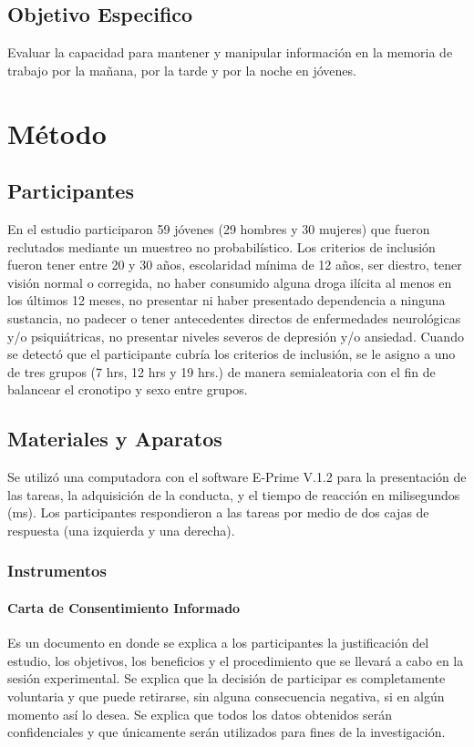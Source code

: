 \documentclass[12pt,letterpaper,final]{article}
\let\cite\cite %
\begin{document}
\subsection{Objetivo Especifico}
Evaluar la capacidad para mantener y manipular información en la memoria de trabajo  por la mañana, por la tarde y por la noche en jóvenes. %

\newpage

\section{Método}
\subsection{Participantes}
En el estudio participaron 59 jóvenes (29 hombres y 30 mujeres) que fueron reclutados mediante un muestreo no probabilístico. Los criterios de inclusión fueron tener entre 20 y 30 años, escolaridad mínima de 12 años, ser diestro, tener visión normal o corregida, no haber consumido alguna droga ilícita al menos en los últimos 12 meses, no presentar ni haber presentado dependencia a ninguna sustancia, no padecer o tener antecedentes directos de enfermedades neurológicas y/o psiquiátricas, no presentar niveles severos de depresión y/o ansiedad. Cuando se detectó que el participante cubría los criterios de inclusión, se le asigno a uno de tres grupos (7 hrs, 12 hrs y 19 hrs.) de manera semialeatoria con el fin de balancear el cronotipo y sexo entre grupos.

\subsection{Materiales y Aparatos}
Se utilizó una computadora con el software E-Prime V.1.2 \textit{\cite{PsychologySoftwareTools2012}} para la presentación de las tareas,  la adquisición de la conducta, y el tiempo de reacción en milisegundos (ms). Los participantes respondieron a las tareas por medio de dos cajas de respuesta (una izquierda y una derecha).

\subsubsection{Instrumentos}
\paragraph{Carta de Consentimiento Informado} Es un documento en donde se explica a los participantes la justificación del estudio, los objetivos, los beneficios y el procedimiento que se llevará a cabo en la sesión experimental. Se explica  que la decisión de participar es completamente voluntaria y que puede retirarse, sin alguna consecuencia negativa, si en algún momento así lo desea. Se explica que todos los datos obtenidos serán confidenciales y que únicamente serán utilizados para fines de la investigación. %
\end{document}
